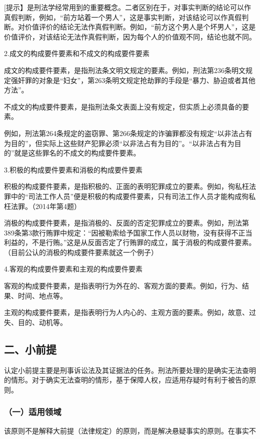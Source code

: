 [提示】是刑法学经常用到的重要概念。二者区别在于，对事实判断的结论可以作真假判断，例如，“前方站着一个男人”，这是事实判断，对该结论可以作真假判断。对价值评价的结论无法作真假判断。例如，“前方这个男人是个坏男人”，这是价值评价，对该结论无法作真假判断，因为每个人的价值观不同，结论也就不同。

2.成文的构成要件要素和不成文的构成要件要素

成文的构成要件要素，是指刑法条文明文规定的要素。例如，刑法第236条明文规定强奸罪的对象是“妇女”，第263条明文规定抢劫罪的手段是“暴力、胁迫或者其他方法”。

不成文的构成要件要素，是指刑法条文表面上没有规定，但实质上必须具备的要素。

例如，刑法第264条规定的盗窃罪、第266条规定的诈骗罪都没有规定“以非法占有为目的”，但实际上这些财产犯罪必须“以非法占有为目的”。“以非法占有为目的”就是这些罪名的不成文的构成要件要素。

3.积极的构成要件要素和消极的构成要件要素

积极的构成要件要素，是指积极的、正面的表明犯罪成立的要素。例如，徇私枉法罪中的“司法工作人员”便是积极的构成要件要素，只有司法工作人员才能构成徇私枉法罪。（2014年第4题）

消极的构成要件要素，是指消极的、反面的否定犯罪成立的要素。例如，刑法第389条第3款行贿罪中规定：“因被勒索给予国家工作人员以财物，没有获得不正当利益的，不是行贿。”这是从反面否定了行贿罪的成立，属于消极的构成要件要素。（目前公认的消极的构成要件要素就这一个例子）

4.客观的构成要件要素和主观的构成要件要素

客观的构成要件要素，是指表明行为外在的、客观方面的要素。例如，行为、结果、时间、地点等。

主观的构成要件要素，是指表明行为人内心的、主观方面的要素。例如，故意、过失、目的、动机等。

\subsection*{二、小前提}

认定小前提主要是刑事诉讼法及其证据法的任务。刑法所要处理的是确实无法查明的情形。对于确实无法查明的情形，基于保障人权，应适用存疑时有利于被告的原则。

\subsubsection*{（一）适用领域}

该原则不是解释大前提（法律规定）的原则，而是解决悬疑事实的原则。在事实不

